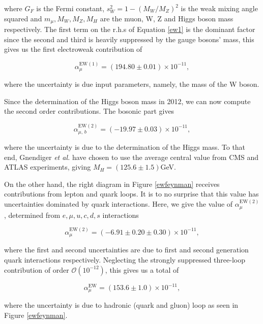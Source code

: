 \documentclass{article}
\numberwithin{equation}{section} %
\begin{document}
\noindent where $G_F$ is the Fermi constant, $s_W^2=1-(M_W/M_Z)^2$ is the weak mixing angle squared and $m_\mu, M_W, M_Z, M_H$ are the muon, W, Z and Higgs boson mass respectively. The first term on the r.h.s of Equation \ref{ew1} is the dominant factor since the second and third is heavily suppressed by the gauge bosons' mass, this gives us the first electroweak contribution of\cite{gnendiger}

\begin{equation}
\alpha_\mu^\mathrm{EW(1)} = (194.80\pm 0.01)\times 10^{-11},
\label{ew1val}
\end{equation}

\noindent where the uncertainty is due input parameters, namely, the mass of the W boson. 

Since the determination of the Higgs boson mass in 2012, we can now compute the second order contributions. The bosonic part gives

\begin{equation}
\alpha_{\mu, \, b}^\mathrm{EW(2)} = (-19.97 \pm 0.03)\times 10^{-11},
\end{equation}

\noindent where the uncertainty is due to the determination of the Higgs mass. To that end,  Gnendiger \textit{et al.} have chosen to use the average central value from CMS and ATLAS experiments, giving $M_H =(125.6\pm 1.5)$GeV.

On the other hand, the right diagram in Figure \ref{ewfeynman} receives contributions from lepton and quark loops. It is to no surprise that this value has uncertainties dominated by quark interactions. Here, we give the value of $\alpha_\mu^\mathrm{EW(2)}$, determined from $e, \mu, u, c , d , s$ interactions

\begin{equation}
\alpha_\mu^\mathrm{EW(2)} = (-6.91\pm 0.20\pm 0.30)\times 10^{-11},
\end{equation}

\noindent where the first and second uncertainties are due to first and second generation quark interactions respectively. Neglecting the strongly suppressed three-loop contribution of order $\mathcal{O}(10^{-12})$\cite{hoecker}, this gives us a total of

\begin{equation}
\alpha_\mu^\mathrm{EW} = (153.6\pm 1.0)\times 10^{-11},
\end{equation}

\noindent where the uncertainty is due to hadronic (quark and gluon) loop as seen in Figure \ref{ewfeynman}\cite{hoecker}.
\end{document}
